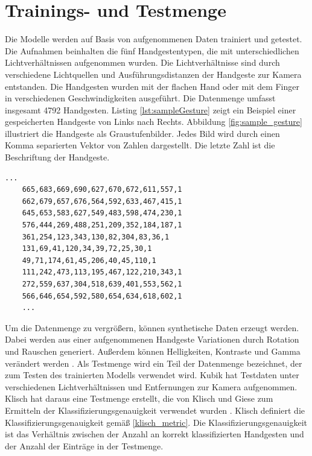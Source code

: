 \section{Trainings- und Testmenge}
\label{sec:synthetischeDaten}
\label{sec:testdaten}
Die Modelle werden auf Basis von aufgenommenen Daten trainiert und getestet. Die Aufnahmen beinhalten die fünf Handgestentypen, die mit unterschiedlichen Lichtverhältnissen aufgenommen wurden. Die Lichtverhältnisse
sind durch verschiedene Lichtquellen und Ausführungsdistanzen der Handgeste zur Kamera entstanden. Die Handgesten wurden mit der flachen Hand oder mit dem Finger in verschiedenen Geschwindigkeiten ausgeführt.
Die Datenmenge umfasst insgesamt 4792 Handgesten.
\newline
\newline
Listing \ref{lst:sampleGesture} zeigt ein Beispiel einer gespeicherten Handgeste von Links nach Rechts. Abbildung \ref{fig:sample_gesture} illustriert die Handgeste als Graustufenbilder.
Jedes Bild wird durch einen Komma separierten Vektor von Zahlen dargestellt. Die letzte Zahl ist die Beschriftung der Handgeste.
\begin{lstlisting}[label=lst:sampleGesture,caption={Beispiel einer gespeicherten Handgeste von Links nach Rechts.}]
    ...
    665,683,669,690,627,670,672,611,557,1
    662,679,657,676,564,592,633,467,415,1
    645,653,583,627,549,483,598,474,230,1
    576,444,269,488,251,209,352,184,187,1
    361,254,123,343,130,82,304,83,36,1
    131,69,41,120,34,39,72,25,30,1
    49,71,174,61,45,206,40,45,110,1
    111,242,473,113,195,467,122,210,343,1
    272,559,637,304,518,639,401,553,562,1
    566,646,654,592,580,654,634,618,602,1
    ...
\end{lstlisting}
Um die Datenmenge zu vergrößern, können synthetische Daten erzeugt werden. Dabei werden aus einer aufgenommenen Handgeste Variationen durch Rotation und Rauschen generiert. Außerdem können Helligkeiten,
Kontraste und Gamma verändert werden \cite{venzkeArticle}.
\newline
\newline
Als Testmenge wird ein Teil der Datenmenge bezeichnet, der zum Testen des trainierten Modells verwendet wird. Kubik hat Testdaten unter verschiedenen Lichtverhältnissen und Entfernungen zur Kamera aufgenommen.
Klisch hat daraus eine Testmenge erstellt, die von Klisch und Giese zum Ermitteln der Klassifizierungsgenauigkeit verwendet wurden \cite{klischThesis, gieseThesis}. Klisch definiert die
Klassifizierungsgenauigkeit gemäß \ref{klisch_metric}. Die Klassifizierungsgenauigkeit ist das Verhältnis zwischen der Anzahl an korrekt klassifizierten Handgesten und der Anzahl der Einträge in der Testmenge.
